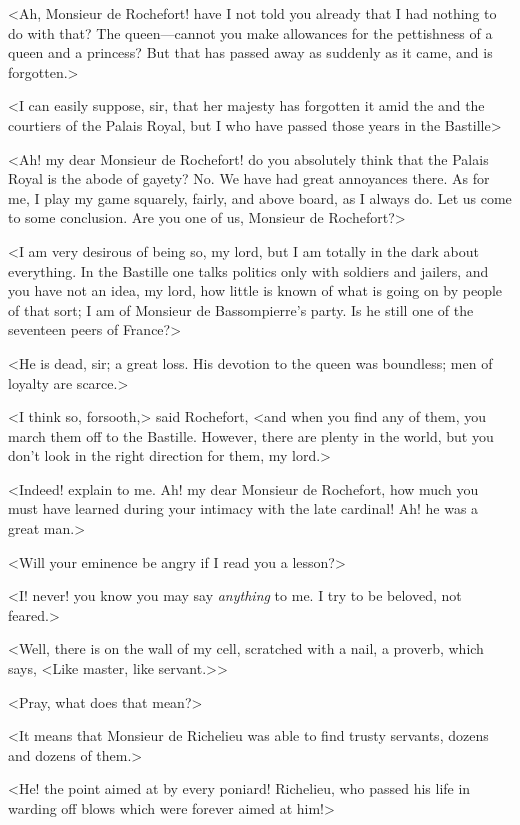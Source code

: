 <Ah, Monsieur de Rochefort! have I not told you already that I had nothing to do with that? The queen—cannot you make allowances for the pettishness of a queen and a princess? But that has passed away as suddenly as it came, and is forgotten.>

<I can easily suppose, sir, that her majesty has forgotten it amid the  and the courtiers of the Palais Royal, but I who have passed those years in the Bastille\longdash>

<Ah!  my dear Monsieur de Rochefort! do you absolutely think that the Palais Royal is the abode of gayety? No. We have had great annoyances there. As for me, I play my game squarely, fairly, and above board, as I always do. Let us come to some conclusion. Are you one of us, Monsieur de Rochefort?>

<I am very desirous of being so, my lord, but I am totally in the dark about everything. In the Bastille one talks politics only with soldiers and jailers, and you have not an idea, my lord, how little is known of what is going on by people of that sort; I am of Monsieur de Bassompierre's party. Is he still one of the seventeen peers of France?>

<He is dead, sir; a great loss. His devotion to the queen was boundless; men of loyalty are scarce.>

<I think so, forsooth,> said Rochefort, <and when you find any of them, you march them off to the Bastille. However, there are plenty in the world, but you don't look in the right direction for them, my lord.>

<Indeed! explain to me. Ah! my dear Monsieur de Rochefort, how much you must have learned during your intimacy with the late cardinal! Ah! he was a great man.>

<Will your eminence be angry if I read you a lesson?>

<I\@! never! you know you may say \emph{anything} to me. I try to be beloved, not feared.>

<Well, there is on the wall of my cell, scratched with a nail, a proverb, which says, <Like master, like servant.>>

<Pray, what does that mean?>

<It means that Monsieur de Richelieu was able to find trusty servants, dozens and dozens of them.>

<He! the point aimed at by every poniard! Richelieu, who passed his life in warding off blows which were forever aimed at him!>

